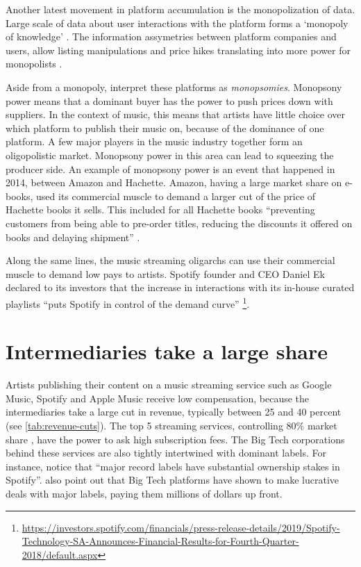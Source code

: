 Another latest movement in platform accumulation is the monopolization of data. Large scale of data about user interactions with the platform forms a `monopoly of knowledge' \citep{innis2007empire}. The information assymetries between platform companies and users, allow listing manipulations and price hikes translating into more power for monopolists \citep{srnicek2017platform}. 

Aside from a monopoly, \cite{rayna2009monometapoly} interpret these platforms as \textit{monopsomies}. Monopsony power means that a dominant buyer has the power to push prices down with suppliers. In the context of music, this means that artists have little choice over which platform to publish their music on, because of the dominance of one platform. A few major players in the music industry together form an oligopolistic market. Monopsony power in this area can lead to squeezing the producer side. An example of monopsony power is an event that happened in 2014, between Amazon and Hachette. Amazon, having a large market share on e-books, used its commercial muscle to demand a larger cut of the price of Hachette books it sells. This included for all Hachette books ``preventing customers from being able to pre-order titles, reducing the discounts it offered on books and delaying shipment'' \citep{theguardian2014amazon}. 

Along the same lines, the music streaming oligarchs can use their commercial muscle to demand low pays to artists. Spotify founder and CEO Daniel Ek declared to its investors that the increase in interactions with its in-house curated playlists ``puts Spotify in control of the demand curve'' \footnote{\url{https://investors.spotify.com/financials/press-release-details/2019/Spotify-Technology-SA-Announces-Financial-Results-for-Fourth-Quarter-2018/default.aspx}}.

\section{Intermediaries take a large share}
Artists publishing their content on a music streaming service such as Google Music, Spotify and Apple Music receive low compensation, because the intermediaries take a large cut in revenue, typically between 25 and 40 percent (see \ref{tab:revenue-cuts}). The top 5 streaming services, controlling 80\% market share \citep{midiamarketshare2020}, have the power to ask high subscription fees. The Big Tech corporations behind these services are also tightly intertwined with dominant labels. For instance, \cite{aguiar2018platforms} notice that ``major record labels have substantial ownership stakes in Spotify''. \cite{meier2019rising} also point out that Big Tech platforms have shown to make lucrative deals with major labels, paying them millions of dollars up front.

